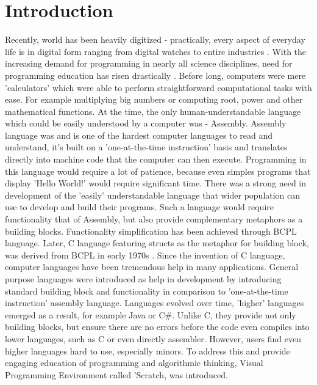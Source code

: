 \documentclass{article}
\begin{document}
\section{Introduction}
Recently, world has been heavily digitized - practically, every aspect of everyday life is in digital form ranging from digital watches to entire industries \citep{jovanovi_digitalization}. With the increasing demand for programming in nearly all science disciplines, need for programming education has risen drastically \citep{MargGoodBern2011wv, jovanovi_digitalization, 7318200}.
Before long, computers were mere 'calculators' which were able to perform straightforward computational tasks with ease. For example multiplying big numbers or computing root, power and other mathematical functions. At the time, the only human-understandable language which could be easily understood by a computer was - Assembly.
Assembly language was and is one of the hardest computer languages to read and understand, it's built on a 'one-at-the-time instruction' basis and translates directly into machine code that the computer can then execute. Programming in this language would require a lot of patience, because even simples programs that display 'Hello World!' would require significant time.
There was a strong need in development of the 'easily' understandable language that wider population can use to develop and build their programs. Such a language would require functionality that of Assembly, but also provide complementary metaphors as a building blocks. Functionality simplification has been achieved through BCPL language. Later, C language featuring structs as the metaphor for building block, was derived from BCPL in early 1970s \citep{ritchie_the}.
Since the invention of C language, computer languages have been tremendous help in many applications. General purpose languages were introduced as help in development by introducing standard building block and functionality in comparison to 'one-at-the-time instruction' assembly language.\citep{10.1145/364063.364092}
Languages evolved over time, 'higher' languages emerged as a result, for example Java or C\#. Unlike C, they provide not only building blocks, but ensure there are no errors before the code even compiles into lower languages, such as C or even directly assembler. However, users find even higher languages hard to use, especially minors. To address this and provide engaging education of programming and algorithmic thinking, Visual Programming Environment called 'Scratch, was introduced.\citep{1314376}
\end{document}
